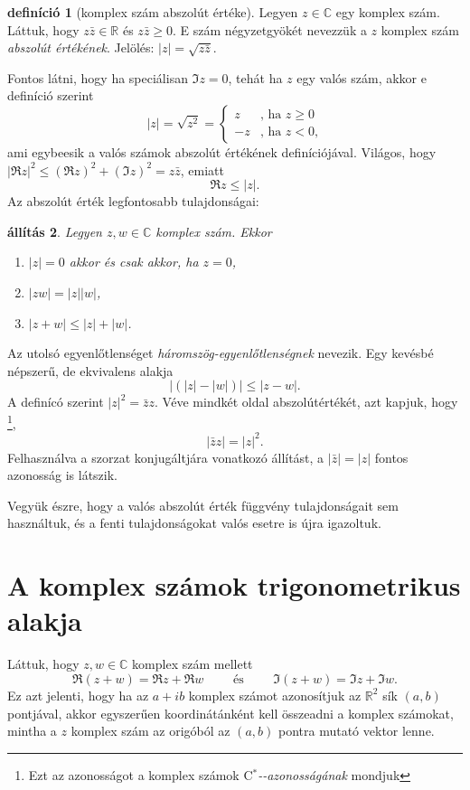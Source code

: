 \documentclass[9pt, a4paper, showtrims]{memoir}
\theoremstyle{plain}
\newtheorem{proposition}{állítás}[chapter]
\theoremstyle{remark}
\theoremstyle{definition}
\newtheorem{definition}[proposition]{definíció}
\newcommand{\Star}[1]{#1\ensuremath{^*}\kern-\scriptspace}
\newcommand{\CStar}{\Star{\ensuremath{\mathrm{C}}}}
\begin{document}
\begin{definition}[komplex szám abszolút értéke]
    Legyen $z\in\mathbb{C}$ egy komplex szám.
    Láttuk, hogy 
    $z\bar{z}\in\mathbb{R}$ és  
    $z\bar{z}\geq 0$.
    E szám négyzetgyökét nevezzük a $z$ komplex szám \emph{abszolút értékének}.
    Jelölés: $|z|=\sqrt{z\bar{z}}$.
\end{definition}
Fontos látni, hogy ha speciálisan $\Im z=0$, 
tehát ha $z$ egy valós szám,
akkor e definíció szerint
\[
    |z|=
    \sqrt{z^2}=
    \begin{cases}
        z&\text{, ha }z\geq 0\\
        -z&\text{, ha }z<0\text{,}
    \end{cases}
\]
ami egybeesik a valós számok abszolút értékének definíciójával.
Világos, hogy $|\Re z|^2\leq(\Re z)^2+(\Im z)^2=z\bar{z}$, emiatt
\[
    \Re z\leq |z|.
\]
Az abszolút érték legfontosabb tulajdonságai:
\begin{proposition}
    Legyen $z,w\in\mathbb{C}$ komplex szám.
    Ekkor
    \begin{enumerate}
        \item $|z|=0$ akkor és csak akkor, ha $z=0$,
        \item $|zw|=|z||w|$,
        \item $|z+w|\leq |z|+|w|$.\qedhere
    \end{enumerate}
\end{proposition}
Az utolsó egyenlőtlenséget \emph{háromszög-egyenlőtlenségnek} nevezik.
Egy kevésbé népszerű, de ekvivalens alakja
\[
    \left|\left( |z|-|w| \right)\right|\leq|z-w|.
\]
A definícó szerint $|z|^2=\bar{z}z$. 
Véve mindkét oldal abszolútértékét, 
azt kapjuk, hogy%
\footnote{Ezt az azonosságot a komplex számok 
    \emph{\CStar-azonosságának}\index{Ccsillag@\CStar-azonosság}
    mondjuk}, 
\[
    |\bar{z}z|=|z|^2.
\]%
Felhasználva a szorzat konjugáltjára vonatkozó állítást,
a $|\bar{z}|=|z|$ fontos azonosság is látszik.


Vegyük észre, hogy a valós abszolút érték függvény tulajdonságait sem használtuk,
és a fenti tulajdonságokat valós esetre is újra igazoltuk.

\section{A komplex számok trigonometrikus alakja}
Láttuk, hogy $z,w\in\mathbb{C}$ komplex szám mellett
\[
    \Re\left( z+w \right)=\Re z+\Re w
    \qquad
    \text{ és }
    \qquad
    \Im\left( z+w \right)=\Im z+\Im w.
\]
Ez azt jelenti, hogy ha az $a+ib$ komplex számot azonosítjuk az $\mathbb{R}^2$ sík
$\left( a,b \right)$ pontjával, 
akkor egyszerűen koordinátánként kell összeadni a komplex számokat, mintha a $z$ komplex szám
az origóból az $\left( a,b \right)$ pontra mutató vektor lenne.
\end{document}
